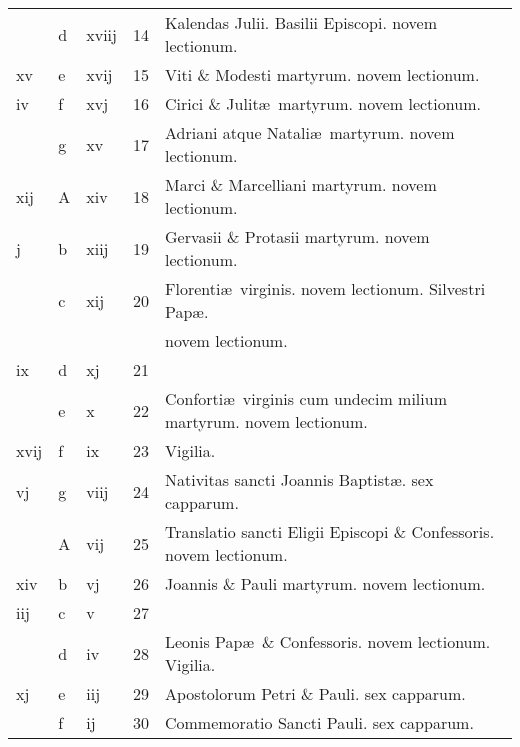 \documentclass[letter,11pt]{book}
\begin{document}
\begin{center}
\begin{tabular}{l | l | l | r | l}
\color{Red}  & d & \color{Red} xviij & 14 & \color{Red} Kalendas Julii. \color{black} Basilii Episcopi. \color{Red} novem lectionum. \\
\color{Red} xv & e & \color{Red} xvij & 15 & Viti \& Modesti martyrum. \color{Red} novem lectionum. \\
\color{Red} iv & f & \color{Red} xvj & 16 & Cirici \& Julit\ae \ martyrum. \color{Red} novem lectionum. \\
\color{Red}  & g & \color{Red} xv & 17 & Adriani atque Natali\ae \ martyrum. \color{Red} novem lectionum. \\
\color{Red} xij & \color{Red} A & \color{Red} xiv & 18 & Marci \& Marcelliani martyrum. \color{Red} novem lectionum. \\
\color{Red} j & b & \color{Red} xiij & 19 & Gervasii \& Protasii martyrum. \color{Red} novem lectionum. \\
\color{Red}  & c & \color{Red} xij & 20 & Florenti\ae \ virginis. \color{Red} novem lectionum. \color{black} Silvestri Pap\ae . \\
 &  &  &  & \quad \color{Red} novem lectionum. \\
\color{Red} ix & d & \color{Red} xj & 21 & \\
\color{Red}  & e & \color{Red} x & 22 & Conforti\ae \ virginis cum undecim milium martyrum. \color{Red} novem lectionum. \\
\color{Red} xvij & f & \color{Red} ix & 23 & \qquad Vigilia. \\
\color{Red} vj & g & \color{Red} viij & 24 & \color{Red} Nativitas sancti Joannis Baptist\ae . \color{black} sex capparum. \\
\color{Red}  & \color{Red} A & \color{Red} vij & 25 & Translatio sancti Eligii Episcopi \& Confessoris. \color{Red} novem lectionum. \\
\color{Red} xiv & b & \color{Red} vj & 26 & Joannis \& Pauli martyrum. \color{Red} novem lectionum. \\
\color{Red} iij & c & \color{Red} v & 27 & \\
\color{Red}  & d & \color{Red} iv & 28 & Leonis Pap\ae \ \& Confessoris. \color{Red} novem lectionum. \color{black} Vigilia. \\
\color{Red} xj & e & \color{Red} iij & 29 & \color{Red} Apostolorum Petri \& Pauli. \color{black} sex capparum. \\
\color{Red}  & f & \color{Red} ij & 30 & Commemoratio Sancti Pauli. \color{Red} sex capparum. \\
\end{tabular}
\end{center}
\end{document}
